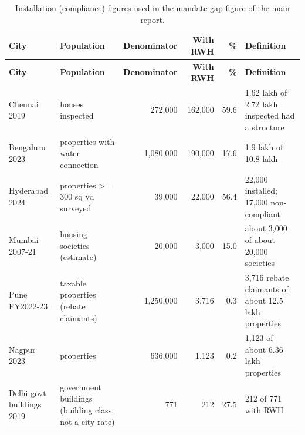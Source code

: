 {\scriptsize\setlength{\tabcolsep}{3pt}
\begin{longtable}{p{2.5cm} p{3.4cm} r r r p{5.5cm}}
\caption{Installation (compliance) figures used in the mandate-gap figure of the main report.}\label{tab:compl}\\
\toprule
\textbf{City} & \textbf{Population} & \textbf{Denominator} & \textbf{With RWH} & \textbf{\%} & \textbf{Definition}\\ \midrule\endfirsthead
\toprule \textbf{City} & \textbf{Population} & \textbf{Denominator} & \textbf{With RWH} & \textbf{\%} & \textbf{Definition}\\ \midrule\endhead
\bottomrule\endfoot
Chennai 2019 & houses inspected & 272,000 & 162,000 & 59.6 & 1.62 lakh of 2.72 lakh inspected had a structure\\
Bengaluru 2023 & properties with water connection & 1,080,000 & 190,000 & 17.6 & 1.9 lakh of 10.8 lakh\\
Hyderabad 2024 & properties >= 300 sq yd surveyed & 39,000 & 22,000 & 56.4 & 22,000 installed; 17,000 non-compliant\\
Mumbai 2007-21 & housing societies (estimate) & 20,000 & 3,000 & 15.0 & about 3,000 of about 20,000 societies\\
Pune FY2022-23 & taxable properties (rebate claimants) & 1,250,000 & 3,716 & 0.3 & 3,716 rebate claimants of about 12.5 lakh properties\\
Nagpur 2023 & properties & 636,000 & 1,123 & 0.2 & 1,123 of about 6.36 lakh properties\\
Delhi govt buildings 2019 & government buildings (building class, not a city rate) & 771 & 212 & 27.5 & 212 of 771 with RWH\\
\end{longtable}}
